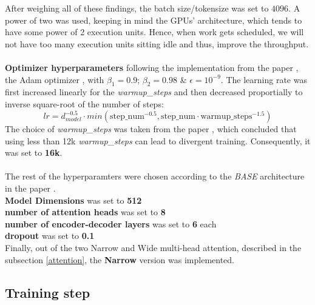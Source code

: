 \documentclass[12pt,a4paper,twoside,openright]{report}
\begin{document}
After weighing all of these findings, the batch size/tokensize was set to $4096$. A power of two was used, keeping in mind the GPUs' architecture, which tends to have some power of 2 execution units. Hence, when work gets scheduled, we will not have too many execution units sitting idle and thus, improve the throughput. 
\\\\
\textbf{Optimizer hyperparameters} following the implementation from the paper \cite{transformers}, the Adam optimizer \cite{adam}, with $\beta_1 = 0.9$; $\beta_2=0.98$ \& $\epsilon=10^{-9}$. The learning rate was first increased linearly for the \textit{warmup\_steps} and then decreased proportially to inverse square-root of the number of steps: 
\[ lr = d_{model}^{-0.5} \cdot min (\text{step\_num}^{-0.5}, \text{step\_num} \cdot \text{warmup\_steps}^{-1.5}) \]
The choice of \textit{warmup\_steps} was taken from the paper \cite{training-tips}, which concluded that using less than 12k \textit{warmup\_steps} can lead to divergent training. Consequently, it was set to \textbf{16k}. 
\\\\
The rest of the hyperparamters were chosen according to the \textit{BASE} architecture in the paper \cite{transformers}. \\
\textbf{Model Dimensions} was set to \textbf{512}
\\
\textbf{number of attention heads} was set to \textbf{8}
\\
\textbf{number of encoder-decoder layers} was set to \textbf{6} each
\\
\textbf{dropout} was set to \textbf{0.1}
\\
Finally, out of the two Narrow and Wide multi-head attention, described in the subsection \ref{attention}, the \textbf{Narrow} version was implemented. 


\subsection{Training step}
\label{training-step}
\end{document}
